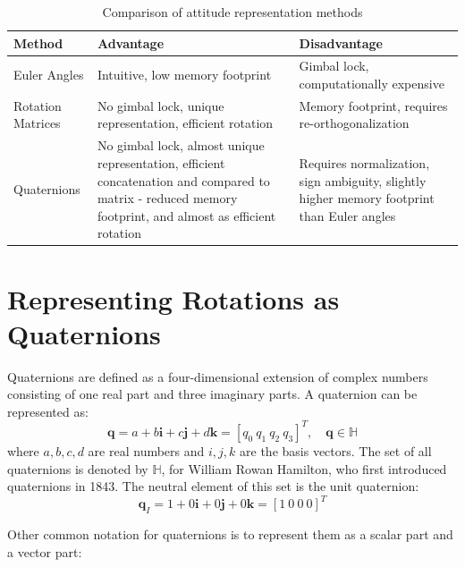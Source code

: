 \begin{table}[H]
	\centering
	\caption{Comparison of attitude representation methods}
	\begin{tabular}{p{} | p{} p{}}
	\toprule
	Method & Advantage & Disadvantage \\
	\midrule
	Euler Angles & Intuitive, low memory footprint & Gimbal lock, computationally expensive \\
	Rotation Matrices & No gimbal lock, unique representation, efficient rotation & Memory footprint, requires re-orthogonalization \\
	Quaternions & No gimbal lock, almost unique representation, efficient concatenation and compared to matrix - reduced memory footprint, and almost as efficient rotation & Requires normalization, sign ambiguity, slightly higher memory footprint than Euler angles \\
	\bottomrule
	\end{tabular}
\end{table}

\section{Representing Rotations as Quaternions}

Quaternions are defined as a four-dimensional extension of complex numbers consisting of one real part and three imaginary parts. A quaternion can be represented as:
\begin{equation}
	\boldsymbol{q} = a + b\mathbf{i} + c\mathbf{j} + d\mathbf{k} = \left[ q_0\ q_1\ q_2\ q_3 \right]^T, \quad \boldsymbol{q} \in \mathbb{H}
	\label{eq:qt}
\end{equation}
where $a,b,c,d$ are real numbers and $i,j,k$ are the basis vectors. The set of all quaternions is denoted by $\mathbb{H}$, for William Rowan Hamilton, who first introduced quaternions in 1843. The neutral element of this set is the unit quaternion:
\begin{equation}
	\boldsymbol{q}_I = 1 + 0\mathbf{i} + 0\mathbf{j} + 0\mathbf{k} = \left[ 1\ 0\ 0\ 0 \right]^T
\end{equation}

Other common notation for quaternions is to represent them as a scalar part and a vector part:

